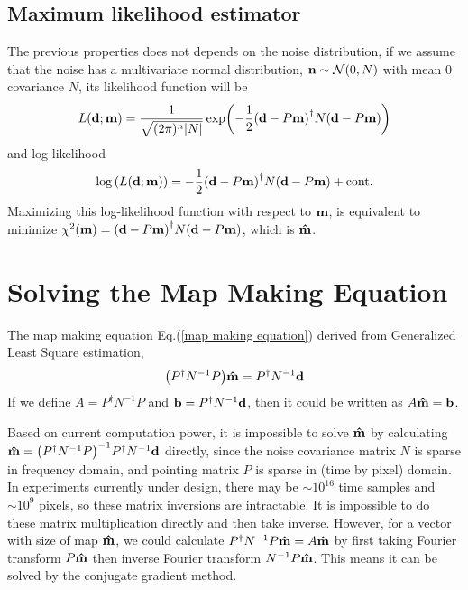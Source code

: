 \documentclass[11pt, letterpaper]{article}
\newcommand{\vbd}{\vb{d}}
\newcommand{\vbm}{\vb{m}}
\newcommand{\vbn}{\vb{n}}
\newcommand{\vbb}{\vb{b}}
\newcommand{\inv}[1]{#1^{-1}}
\newcommand{\hatm}{\vb{\hat{m}}}
\newcommand{\Pdagger}{P^{\dagger}}
\newcommand{\PPinv}[1]{\inv{\qty(\Pdagger #1 P)}}
\begin{document}
\subsection{Maximum likelihood estimator}
The previous properties does not depends on the noise distribution, 
if we assume that the noise has a multivariate normal distribution,
$\vbn \sim \mathcal{N}(0, N)$ with mean $0$ covariance $N$,
its likelihood function will be
\begin{align}
L\qty(\vbd;\vbm) = \frac{1}{\sqrt{(2\pi)^n \abs{N}}} 
    \exp(-\frac{1}{2} \qty(\vbd - P\vbm)^{\dagger} N \qty(\vbd - P\vbm))
\end{align}
and log-likelihood
\begin{align}
\log\qty(L\qty(\vbd;\vbm))
= -\frac{1}{2} \qty(\vbd - P\vbm)^{\dagger} N \qty(\vbd - P\vbm) + \text{cont.}  
\end{align}
Maximizing this log-likelihood function with respect to $\vbm$, is equivalent
to minimize $\chi^2(\vbm) =\qty(\vbd - P\vbm)^{\dagger} N \qty(\vbd - P\vbm)$,
which is $\hatm$.

\section{Solving the Map Making Equation}

The map making equation Eq.(\ref{map making equation}) derived from Generalized
Least Square estimation,
\begin{align}
\qty(\Pdagger \inv{N}  P) \hatm = \Pdagger \inv{N} \vbd \label{map making eq}
\end{align}
If we define $A = \Pdagger \inv{N} P$ and $\vbb = \Pdagger \inv{N} \vbd$,
then it could be written as $A\hatm = \vbb$.

Based on current computation power, it is impossible to solve $\hatm$
by calculating $\hatm = \PPinv{\inv{N}} \Pdagger \inv{N} \vbd$ directly,
since the noise covariance matrix $N$ is sparse in frequency domain,
and pointing matrix $P$ is sparse in (time by pixel) domain.  In experiments currently under design, there may be $\sim 10^{16}$ time samples and $\sim 10^{9}$ pixels, so these matrix inversions are intractable.
It is impossible to do these matrix multiplication directly and then take
inverse.
However, for a vector with size of map $\hatm$, we could calculate
$\Pdagger \inv{N} P \hatm = A\hatm$ by first taking Fourier transform $P\hatm$
then inverse Fourier transform $\inv{N}P\hatm$.
This means it can be solved by the conjugate gradient method.
\end{document}
